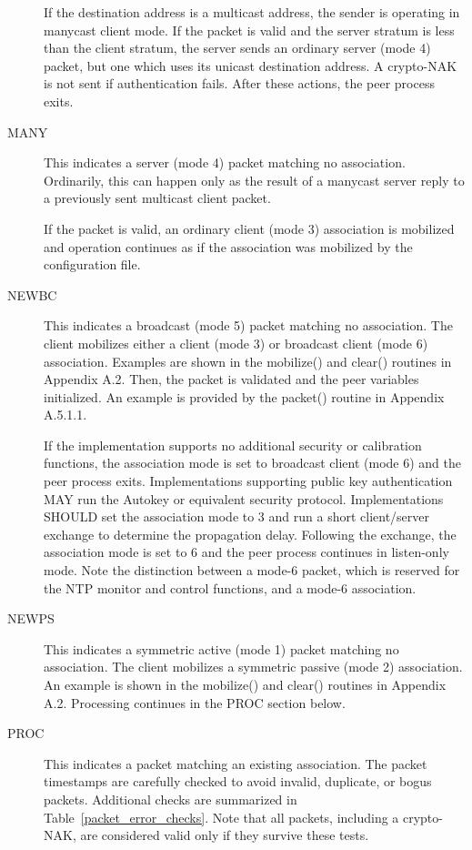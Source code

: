 \begin{description}
    If the destination address is a multicast address, the sender is
    operating in manycast client mode. If the packet is valid and the
    server stratum is less than the client stratum, the server sends an
    ordinary server (mode 4) packet, but one which uses its unicast
    destination address. A crypto-NAK is not sent if authentication
    fails. After these actions, the peer process exits.

  \item[MANY] This indicates a server (mode 4) packet matching no
    association. Ordinarily, this can happen only as the result of a
    manycast server reply to a previously sent multicast client packet.

    If the packet is valid, an ordinary client (mode 3) association is
    mobilized and operation continues as if the association was mobilized
    by the configuration file.

  \item[NEWBC] This indicates a broadcast (mode 5) packet matching no
    association. The client mobilizes either a client (mode 3) or
    broadcast client (mode 6) association. Examples are shown in the
    mobilize() and clear() routines in Appendix A.2. Then, the packet is
    validated and the peer variables initialized. An example is provided
    by the packet() routine in Appendix A.5.1.1.

    If the implementation supports no additional security or calibration
    functions, the association mode is set to broadcast client (mode 6)
    and the peer process exits. Implementations supporting public key
    authentication MAY run the Autokey or equivalent security protocol.
    Implementations SHOULD set the association mode to 3 and run a short
    client/server exchange to determine the propagation delay. Following
    the exchange, the association mode is set to 6 and the peer process
    continues in listen-only mode. Note the distinction between a mode-6
    packet, which is reserved for the NTP monitor and control functions,
    and a mode-6 association.

  \item[NEWPS] This indicates a symmetric active (mode 1) packet matching no
    association. The client mobilizes a symmetric passive (mode 2)
    association. An example is shown in the mobilize() and clear()
    routines in Appendix A.2. Processing continues in the PROC section
    below.

  \item[PROC] This indicates a packet matching an existing association. The
    packet timestamps are carefully checked to avoid invalid, duplicate,
    or bogus packets. Additional checks are summarized in Table~\ref{packet_error_checks}.
    Note that all packets, including a crypto-NAK, are considered valid
    only if they survive these tests.


\end{description}
